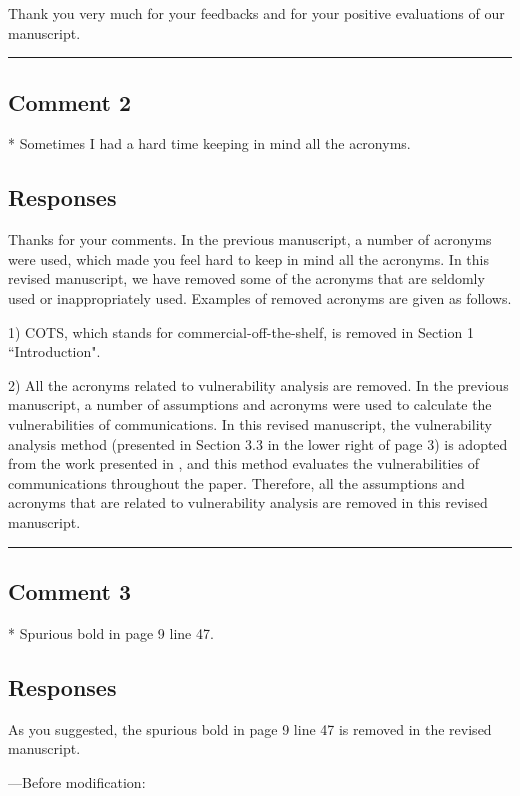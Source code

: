 \documentclass[10pt,journal, compsoc]{IEEEtran}
\begin{document}
Thank you very much for your feedbacks and for your positive evaluations of our manuscript.

\noindent\rule[0.25\baselineskip]{252pt}{1pt}


\subsection*{Comment 2}
* Sometimes I had a hard time keeping in mind all the acronyms.

\subsection*{Responses}
Thanks for your comments. In the previous manuscript, a number of acronyms were used, which made you feel hard to keep in mind all the acronyms. In this revised manuscript, we have removed some of the acronyms that are seldomly used or inappropriately used. Examples of removed acronyms are given as follows.

\vspace{0.5em}
1) COTS, which stands for commercial-off-the-shelf, is removed in Section 1 ``Introduction".

\vspace{0.5em}
2) All the acronyms related to vulnerability analysis are removed. In the previous manuscript, a number of assumptions and acronyms were used to calculate the vulnerabilities of communications. In this revised manuscript, the vulnerability analysis method (presented in Section 3.3 in the lower right of page 3) is adopted from the work presented in \cite{conference:HS}, and this method evaluates the vulnerabilities of communications throughout the paper. Therefore, all the assumptions and acronyms that are related to vulnerability analysis are removed in this revised manuscript.


\noindent\rule[0.25\baselineskip]{252pt}{1pt}


\subsection*{Comment 3}
* Spurious bold in page 9 line 47.

\subsection*{Responses}
As you suggested, the spurious bold in page 9 line 47 is removed in the revised manuscript.

\vspace{0.5em}
\noindent---Before modification:
\end{document}
